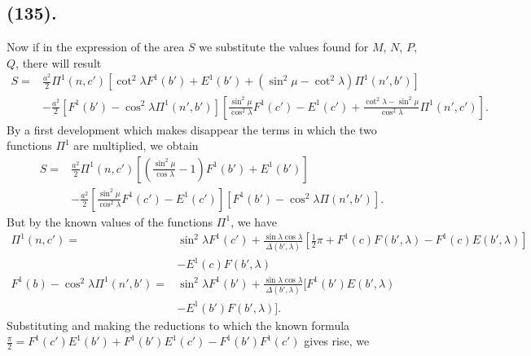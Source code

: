 \documentclass{article}
\begin{document}
\subsection*{(135).}

Now if in the expression of the area $S$ we substitute the values found for $M$, $N$, $P$, $Q$, there will result
\[ \begin{aligned} S={}&\frac{a^{2}}{2}\Pi^{1}(n,c')[\cot^{2}\lambda F^{1}(b')+E^{1}(b')+(\sin^{2}\mu-\cot^{2}\lambda)\Pi^{1}(n',b')]\\ &-\frac{a^{2}}{2}[F^{1}(b')-\cos^{2}\lambda\Pi^{1}(n',b')]\left[\frac{\sin^{2}\mu}{\cos^{2}\lambda}F^{1}(c')-E^{1}(c')+\frac{\cot^{2}\lambda-\sin^{2}\mu}{\cos^{2}\lambda}\Pi^{1}(n',c')\right]. \end{aligned} \]
By a first development which makes disappear the terms in which the two functions $\Pi^{1}$ are multiplied, we obtain
\[ \begin{aligned} S={}&\frac{a^{2}}{2}\Pi^{1}(n,c')\left[\left(\frac{\sin^{2}\mu}{\cos\lambda}-1\right)F^{1}(b')+E^{1}(b')\right]\\ &-\frac{a^{2}}{2}\left[\frac{\sin^{2}\mu}{\cos^{2}\lambda}F^{1}(c')-E^{1}(c')\right][F^{1}(b')-\cos^{2}\lambda\Pi(n',b')]. \end{aligned} \]
But by the known values of the functions $\Pi^{1}$, we have
\[ \begin{aligned} \Pi^{1}(n,c')={}&\sin^{2}\lambda F^{1}(c')+\frac{\sin\lambda\cos\lambda}{\Delta(b',\lambda)}[\tfrac{1}{2}\pi+F^{1}(c)F(b',\lambda)-F^{1}(c)E(b',\lambda)]\\ &-E^{1}(c)F(b',\lambda)\\ F^{1}(b)-\cos^{2}\lambda\Pi^{1}(n',b')={}&\sin^{2}\lambda F^{1}(b')+\frac{\sin\lambda\cos\lambda}{\Delta(b',\lambda)}[F^{1}(b')E(b',\lambda)\\ &-E^{1}(b')F(b',\lambda)]. \end{aligned} \]
Substituting and making the reductions to which the known formula $\frac{\pi}{2}=F^{1}(c')E^{1}(b')+F^{1}(b')E^{1}(c')-F^{1}(b')F^{1}(c')$ gives rise, we
\end{document}
